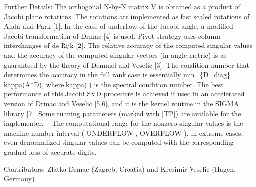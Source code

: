 \begin{DoxyParagraph}{Further Details\+: }
The orthogonal N-\/by-\/\+N matrix V is obtained as a product of Jacobi plane rotations. The rotations are implemented as fast scaled rotations of Anda and Park \mbox{[}1\mbox{]}. In the case of underflow of the Jacobi angle, a modified Jacobi transformation of Drmac \mbox{[}4\mbox{]} is used. Pivot strategy uses column interchanges of de Rijk \mbox{[}2\mbox{]}. The relative accuracy of the computed singular values and the accuracy of the computed singular vectors (in angle metric) is as guaranteed by the theory of Demmel and Veselic \mbox{[}3\mbox{]}. The condition number that determines the accuracy in the full rank case is essentially min\+\_\+\{D=diag\} kappa(\+A$\ast$\+D), where kappa(.) is the spectral condition number. The best performance of this Jacobi S\+V\+D procedure is achieved if used in an accelerated version of Drmac and Veselic \mbox{[}5,6\mbox{]}, and it is the kernel routine in the S\+I\+G\+M\+A library \mbox{[}7\mbox{]}. Some tunning parameters (marked with \mbox{[}T\+P\mbox{]}) are available for the implementer. ~\newline
 The computational range for the nonzero singular values is the machine number interval ( U\+N\+D\+E\+R\+F\+L\+O\+W , O\+V\+E\+R\+F\+L\+O\+W ). In extreme cases, even denormalized singular values can be computed with the corresponding gradual loss of accurate digits.
\end{DoxyParagraph}
\begin{DoxyParagraph}{Contributors\+: }
Zlatko Drmac (Zagreb, Croatia) and Kresimir Veselic (Hagen, Germany)
\end{DoxyParagraph}
